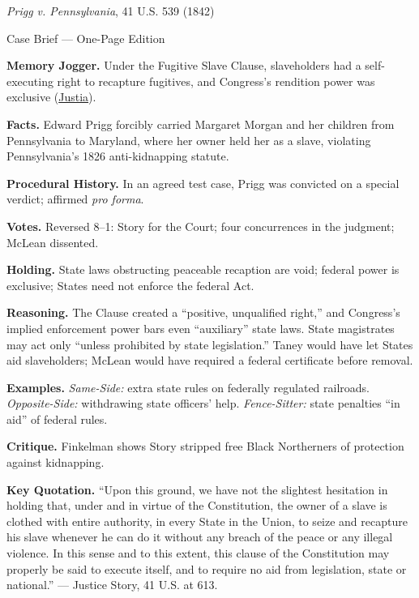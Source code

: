 \documentclass[12pt]{article}
\begin{document}
\begin{center}
{\Large \textit{Prigg v. Pennsylvania}, 41 U.S. 539 (1842)\par}
\vspace{0.3em}
{\normalsize Case Brief --- One-Page Edition\par}
\end{center}

\textbf{Memory Jogger.} Under the Fugitive Slave Clause, slaveholders had a self-executing right to recapture fugitives, and Congress's rendition power was exclusive (\href{https://supreme.justia.com/cases/federal/us/41/539/}{Justia}).

\textbf{Facts.} Edward Prigg forcibly carried Margaret Morgan and her children from Pennsylvania to Maryland, where her owner held her as a slave, violating Pennsylvania's 1826 anti-kidnapping statute.

\textbf{Procedural History.} In an agreed test case, Prigg was convicted on a special verdict; affirmed \textit{pro forma}.

\textbf{Votes.} Reversed 8--1: Story for the Court; four concurrences in the judgment; McLean dissented.

\textbf{Holding.} State laws obstructing peaceable recaption are void; federal power is exclusive; States need not enforce the federal Act.

\textbf{Reasoning.} The Clause created a ``positive, unqualified right,'' and Congress's implied enforcement power bars even ``auxiliary'' state laws. State magistrates may act only ``unless prohibited by state legislation.'' Taney would have let States aid slaveholders; McLean would have required a federal certificate before removal.

\textbf{Examples.} \emph{Same-Side:} extra state rules on federally regulated railroads. \emph{Opposite-Side:} withdrawing state officers' help. \emph{Fence-Sitter:} state penalties ``in aid'' of federal rules.

\textbf{Critique.} Finkelman shows Story stripped free Black Northerners of protection against kidnapping.

\textbf{Key Quotation.} ``Upon this ground, we have not the slightest hesitation in holding that, under and in virtue of the Constitution, the owner of a slave is clothed with entire authority, in every State in the Union, to seize and recapture his slave whenever he can do it without any breach of the peace or any illegal violence. In this sense and to this extent, this clause of the Constitution may properly be said to execute itself, and to require no aid from legislation, state or national.'' --- Justice Story, 41 U.S. at 613.
\end{document}
